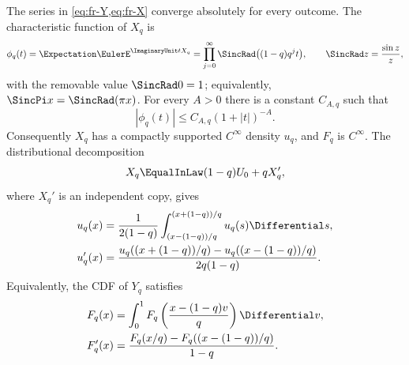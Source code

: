 \begin{theorem}
\label{thm:fr-geometric-density}
The series in \cref{eq:fr-Y,eq:fr-X} converge absolutely for every outcome.
The characteristic function of \(X_q\) is
\begin{equation}
 \phi_q(t)=\Expectation\EulerE^{\ImaginaryUnit tX_q}
 =\prod_{j=0}^{\infty}\SincRad\bigl((1-q)q^jt\bigr),
 \qquad \SincRad z=\frac{\sin z}{z},
 \label{eq:fr-sinc-product}
\end{equation}
with the removable value \(\SincRad 0=1\); equivalently,
\(\SincPi x=\SincRad(\pi x)\).  For every \(A>0\) there is a constant
\(C_{A,q}\) such that
\begin{equation}
 |\phi_q(t)|\le C_{A,q}(1+|t|)^{-A}.
 \label{eq:fr-fourier-rapid}
\end{equation}
Consequently \(X_q\) has a compactly supported \(C^\infty\) density \(u_q\),
and \(F_q\) is \(C^\infty\).  The distributional decomposition
\[
 X_q\EqualInLaw (1-q)U_0+qX_q',
\]
where \(X_q'\) is an independent copy, gives
\begin{align}
 u_q(x)
 &=\frac1{2(1-q)}
   \int_{(x-(1-q))/q}^{(x+(1-q))/q}u_q(s)\Differential s,
 \label{eq:fr-density-refinement}\\
 u_q'(x)
 &=\frac{u_q((x+(1-q))/q)-u_q((x-(1-q))/q)}
 {2q(1-q)}.\label{eq:fr-density-derivative}
\end{align}
Equivalently, the CDF of \(Y_q\) satisfies
\begin{align}
 F_q(x)
 &=\int_0^1F_q\left(\frac{x-(1-q)v}{q}\right)\Differential v,
 \label{eq:fr-cdf-refinement}\\
 F_q'(x)
 &=\frac{F_q(x/q)-F_q((x-(1-q))/q)}{1-q}.
 \label{eq:fr-cdf-derivative}
\end{align}
\end{theorem}

